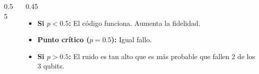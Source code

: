 \documentclass[english,9pt]{Linnaeus}
\begin{document}
\begin{frame}
\begin{columns}[c]
\begin{column}{0.55\textwidth}
{%
          }
        \end{column}

        \begin{column}{0.45\textwidth}
          \begin{itemize}
            \item \textbf{Si $p < 0.5$:} El código funciona. Aumenta la fidelidad.
            \item \textbf{Punto crítico ($p = 0.5$):} Igual fallo.
            \item \textbf{Si $p > 0.5$:} El ruido es tan alto que es más probable que fallen 2 de los 3 qubits.
          \end{itemize}
        \end{column}
      \end{columns}
    \end{frame}

  
\end{document}
